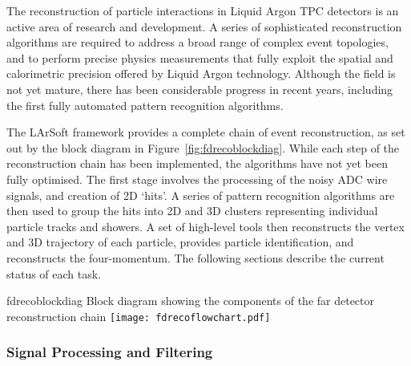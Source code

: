 The reconstruction of particle interactions in Liquid Argon TPC
detectors is an active area of research and development.
A series of sophisticated reconstruction algorithms are required to
address a broad range of complex event topologies, and to perform
precise physics measurements that fully exploit the spatial and 
calorimetric precision offered by Liquid Argon technology.
Although the field is not yet mature, there has been considerable
progress in recent years, including the first fully automated
pattern recognition algorithms. 

The LArSoft framework provides a complete chain of event reconstruction,
as set out by the block diagram in Figure~\ref{fig:fdrecoblockdiag}.
While each step of the reconstruction chain has been implemented,
the algorithms have not yet been fully optimised.
The first stage involves the processing of the noisy ADC wire signals,
and creation of 2D `hits'. A series of pattern recognition algorithms
are then used to group the hits into 2D and 3D clusters representing 
individual particle tracks and showers. A set of high-level tools
then reconstructs the vertex and 3D trajectory of each particle,
provides particle identification, and reconstructs the four-momentum.
The following sections describe the current status of each task.


\begin{cdrfigure}{fdrecoblockdiag}
{Block diagram showing the components of the far detector reconstruction chain}
\texttt{[image: fdrecoflowchart.pdf]}
\end{cdrfigure}


\subsubsection{Signal Processing and Filtering}

